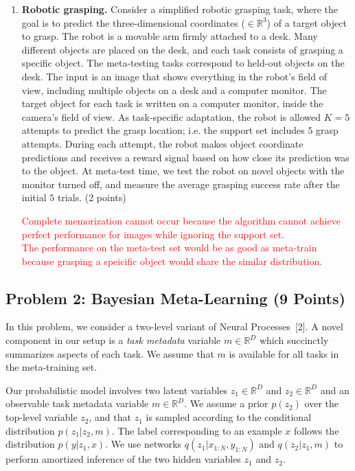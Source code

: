 \documentclass[12pt]{article}
\begin{document}
\begin{enumerate}[label=(\alph*)]
\item \textbf{Robotic grasping.}
Consider a simplified robotic grasping task, where the goal is to predict the three-dimensional coordinates ($\in \mathbb{R}^3$) of a target object to grasp.
The robot is a movable arm firmly attached to a desk.
Many different objects are placed on the desk, and each task consists of grasping a specific object. The meta-testing tasks correspond to held-out objects on the desk.
The input is an image that shows everything in the robot's field of view, including multiple objects on a desk and a computer monitor.
The target object for each task is written on a computer monitor, inside the camera's field of view.
As task-specific adaptation, the robot is allowed $K=5$ attempts to predict the grasp location; i.e. the support set includes $5$ grasp attempts.
During each attempt, the robot makes object coordinate predictions and receives a reward signal based on how close its prediction was to the object.
At meta-test time, we test the robot on novel objects with the monitor turned off, and measure the average grasping success rate after the initial $5$ trials.
(2 points)

\textcolor{red}{Complete memorization cannot occur because the algorithm cannot achieve perfect performance for images while ignoring the support set.\\
The performance on the meta-test set would be as good as meta-train because grasping a speicific object would share the similar distribution.}

\end{enumerate}

\subsection*{Problem 2: Bayesian Meta-Learning (9 Points)}
In this problem, we consider a two-level variant of Neural Processes~[2].
A novel component in our setup is a \textit{task metadata} variable $m \in \mathbb{R}^D$ which succinctly summarizes aspects of each task.
We assume that $m$ is available for all tasks in the meta-training set.

Our probabilistic model involves two latent variables $z_1 \in \mathbb{R}^D$ and $z_2 \in \mathbb{R}^D$ and an observable task metadata variable $m \in \mathbb{R}^D$.
We assume a prior $p(z_2)$ over the top-level variable $z_2$, and that $z_1$ is sampled according to the conditional distribution $p(z_1 | z_2, m)$.
The label corresponding to an example $x$ follows the distribution $p(y | z_1, x)$.
We use networks $q(z_1 | x_{1:N}, y_{1:N})$ and $q(z_2 | z_1, m)$ to perform amortized inference of the two hidden variables $z_1$ and $z_2$.
\end{document}
